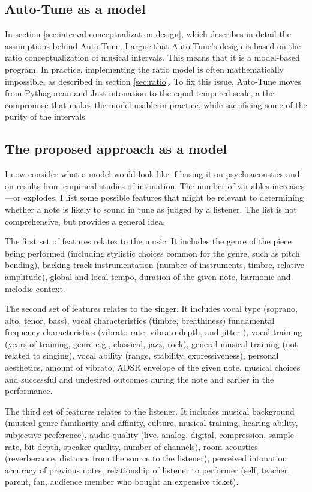 \subsection{Auto-Tune as a model}
In section \ref{sec:interval-conceptualization-design}, which describes in detail the assumptions behind Auto-Tune, I argue that Auto-Tune's design is based on the ratio conceptualization of musical intervals. This means that it is a model-based program. In practice, implementing the ratio model is often mathematically impossible, as described in section \ref{sec:ratio}. To fix this issue, Auto-Tune moves from Pythagorean and Just intonation to the equal-tempered scale, a the compromise that makes the model usable in practice, while sacrificing some of the purity of the intervals.

\subsection{The proposed approach as a model}
I now consider what a model would look like if basing it on psychoacoustics and on results from empirical studies of intonation. The number of variables increases---or explodes. I list some possible features that might be relevant to determining whether a note is likely to sound in tune as judged by a listener. The list is not comprehensive, but provides a general idea.

The first set of features relates to the music. It includes the genre of the piece being performed (including stylistic choices common for the genre, such as pitch bending), backing track instrumentation (number of instruments, timbre, relative amplitude), global and local tempo, duration of the given note, harmonic and melodic context.

The second set of features relates to the singer. It includes vocal type (soprano, alto, tenor, bass), vocal characteristics (timbre, breathiness) fundamental frequency characteristics (vibrato rate, vibrato depth, and jitter \cite{devaney2020new}), vocal training (years of training, genre e.g., classical, jazz, rock), general musical training (not related to singing), vocal ability (range, stability, expressiveness), personal aesthetics, amount of vibrato, ADSR envelope of the given note, musical choices and successful and undesired outcomes during the note and earlier in the performance.

The third set of features relates to the listener. It includes musical background (musical genre familiarity and affinity, culture, musical training, hearing ability, subjective preference), audio quality (live, analog, digital, compression, sample rate, bit depth, speaker quality, number of channels), room acoustics (reverberance, distance from the source to the listener), perceived intonation accuracy of previous notes, relationship of listener to performer (self, teacher, parent, fan, audience member who bought an expensive ticket).

